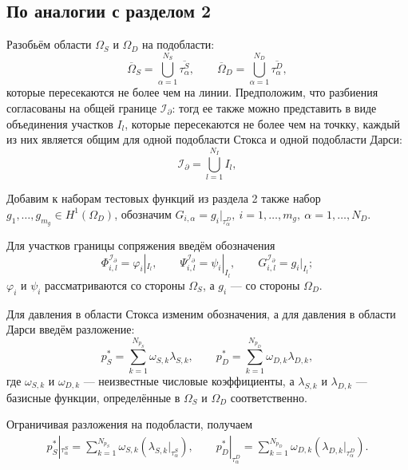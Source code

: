 \documentclass[a4paper,14pt]{extarticle}
\begin{document}
\subsection*{По аналогии с разделом 2} 
Разобьём области $\Omega_S$ и
$\Omega_D$ на подобласти:
\begin{equation}
	\overline{\Omega}_S
	=
	\bigcup_{\alpha=1}^{N_S}
	\overline{\tau^S_\alpha},
	\qquad
	\overline{\Omega}_D
	=
	\bigcup_{\alpha=1}^{N_D}
	\overline{\tau^D_\alpha},
\end{equation}
которые пересекаются не более чем на линии.
Предположим, что разбиения согласованы на общей границе
$\mathcal I_\partial$: тогд ее также можно представить в виде
объединения участков $I_l$, которые пересекаются не более чем на точкку, каждый из них является
общим для одной подобласти Стокса и одной подобласти Дарси:
\begin{equation}
	\mathcal I_\partial
	=
	\bigcup_{l=1}^{N_I} I_l,
\end{equation} 

Добавим к наборам тестовых функций из раздела 2 также набор $g_1,\ldots,g_{m_g}\in H^1(\Omega_D)$,
обозначим $ G_{i,\alpha} = g_i|_{\tau^D_\alpha},~
i=1,\ldots,m_g,~ \alpha=1,\ldots,N_D. $

Для участков границы сопряжения введём обозначения
\begin{equation}
	\Phi^{\mathcal I_\partial}_{i,l}
	=
	\varphi_i|_{I_l},
	\qquad
	\Psi^{\mathcal I_\partial}_{i,l}
	=
	\psi_i|_{I_l},
	\qquad
	G^{\mathcal I_\partial}_{i,l}
	=
	g_i|_{I_l};
\end{equation}
$\varphi_i$ и $\psi_i$ рассматриваются со стороны
$\Omega_S$, а $g_i$ --- со стороны $\Omega_D$.

Для давления в области Стокса изменим обозначения, а для
давления в области Дарси введём разложение:
\begin{equation}
	p_S^*
	=
	\sum_{k=1}^{N_{p_S}}
	\omega_{S,k}\lambda_{S,k},
	\qquad
	p_D^*
	=
	\sum_{k=1}^{N_{p_D}}
	\omega_{D,k}\lambda_{D,k},
\end{equation}
где $\omega_{S,k}$ и $\omega_{D,k}$ --- неизвестные
числовые коэффициенты, а $\lambda_{S,k}$ и $\lambda_{D,k}$
--- базисные функции, определённые в $\Omega_S$ и
$\Omega_D$ соответственно.

Ограничивая разложения на подобласти, получаем
\begin{equation}
	\begin{gathered}
		p_S^*|_{\tau^S_\alpha}
		=
		\sum_{k=1}^{N_{p_S}}
		\omega_{S,k}
		\left(\lambda_{S,k}|_{\tau^S_\alpha}\right),
		\qquad
		p_D^*|_{\tau^D_\alpha}
		=
		\sum_{k=1}^{N_{p_D}}
		\omega_{D,k}
		\left(\lambda_{D,k}|_{\tau^D_\alpha}\right).
	\end{gathered}
\end{equation}
\end{document}
